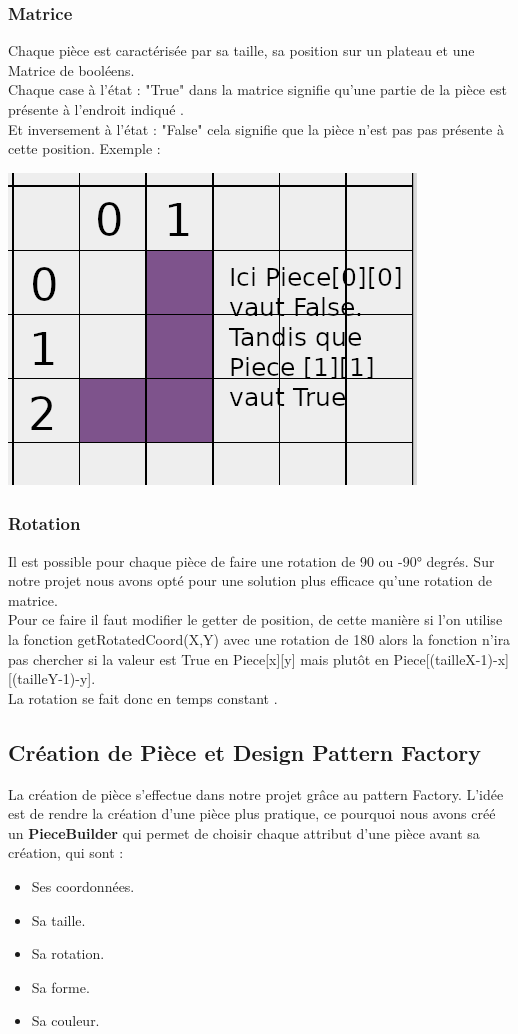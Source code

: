 \documentclass[a4paper,12pt]{article} %
\begin{document}
\subsubsection{Matrice}
Chaque pièce est caractérisée par sa taille, sa position sur un plateau et une Matrice de booléens.\\
Chaque case à l'état : "True" dans la matrice signifie qu'une partie de la pièce est présente à l'endroit indiqué .\\
Et inversement à l'état : "False" cela signifie que la pièce n'est pas pas présente à cette position.
Exemple : 
\begin{center}
\includegraphics[scale=0.5]{images/Piece1.png}
\end{center}
\subsubsection{Rotation}
Il est possible pour chaque pièce de faire une rotation de 90 ou -90° degrés.
Sur notre projet nous avons opté pour une solution plus efficace qu'une rotation de matrice.\\
Pour ce faire il faut modifier le getter de position, de cette manière si l'on utilise la fonction getRotatedCoord(X,Y) avec une rotation de 180 alors la fonction n'ira pas chercher si la valeur est True en Piece[x][y] mais plutôt en Piece[(tailleX-1)-x][(tailleY-1)-y].\\
La rotation se fait donc en temps constant .
\subsection{Création de Pièce et Design Pattern Factory}
\label{Design Factory}
La création de pièce s'effectue dans notre projet grâce au pattern Factory. L'idée est de rendre la création d'une pièce plus pratique, ce pourquoi nous avons créé un \textbf{PieceBuilder} qui permet de choisir chaque attribut d'une pièce avant sa création, qui sont :
\begin{itemize}
    \item Ses coordonnées.
    \item Sa taille.
    \item Sa rotation.
    \item Sa forme.
    \item Sa couleur.
\end{itemize}
\end{document}

